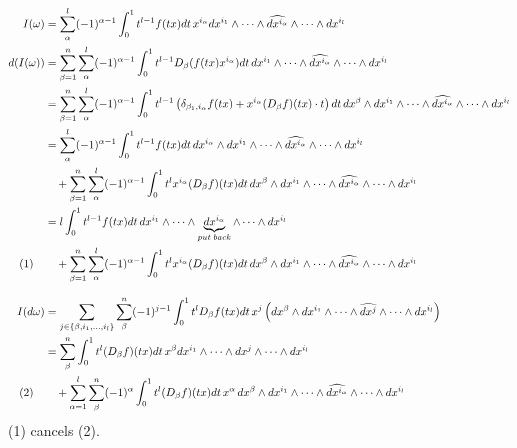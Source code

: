 \documentclass[11pt]{article}
\begin{document}
\begin{align*}
I(\omega) &=  \sum\limits_{\alpha}^{l} (-1)^{\alpha-1} \int_0^1 t^{l-1} f(tx) dt\, x^{i_\alpha} dx^{i_1} \wedge \cdots \wedge \widehat{dx^{i_\alpha}}  \wedge \cdots \wedge dx^{i_l}\\
d(I(\omega)) &= \sum\limits_{\beta=1}^{n} \sum\limits_{\alpha}^{l} (-1)^{\alpha-1} \int_0^1 t^{l-1}D_\beta(f(tx)x^{i_\alpha}) dt \, dx^{i_1} \wedge \cdots \wedge \widehat{dx^{i_\alpha}}  \wedge \cdots \wedge dx^{i_l}\\
&=\sum\limits_{\beta=1}^{n} \sum\limits_{\alpha}^{l} (-1)^{\alpha-1} \int_0^1 t^{l-1} \left(\delta_{\beta_1,i_\alpha}f(tx) +x^{i_\alpha}(D_\beta f)(tx)\cdot t \right)dt\,dx^\beta \wedge dx^{i_1} \wedge \cdots \wedge \widehat{dx^{i_\alpha}}  \wedge \cdots \wedge dx^{i_l}\\
&= \sum\limits_{\alpha}^{l} (-1)^{\alpha-1} \int_0^1 t^{l-1}f(tx) dt\,dx^{i_\alpha} \wedge dx^{i_1} \wedge \cdots \wedge \widehat{dx^{i_\alpha}}  \wedge \cdots \wedge dx^{i_l}\\
&\quad +\sum\limits_{\beta=1}^{n} \sum\limits_{\alpha}^{l} (-1)^{\alpha-1} \int_0^1 t^{l}x^{i_\alpha}(D_\beta f)(tx) dt\,dx^\beta \wedge dx^{i_1} \wedge \cdots \wedge \widehat{dx^{i_\alpha}}  \wedge \cdots \wedge dx^{i_l}\\
&= l \int_0^1 t^{l-1}f(tx) dt\, dx^{i_1} \wedge \cdots \wedge \underbrace{dx^{i_\alpha}}_{put \;back}  \wedge \cdots \wedge dx^{i_l}\\
(1) \quad &\quad+\sum\limits_{\beta=1}^{n} \sum\limits_{\alpha}^{l} (-1)^{\alpha-1} \int_0^1 t^{l}x^{i_\alpha}(D_\beta f)(tx) dt\,dx^\beta \wedge dx^{i_1} \wedge \cdots \wedge \widehat{dx^{i_\alpha}}  \wedge \cdots \wedge dx^{i_l}\\
\intertext{}
I(d\omega) &= \sum\limits_{j \in \{\beta, i_1, \dots, i_l\}} \sum\limits_{\beta}^{n} (-1)^{j-1} \int_0^1 t^{l} D_\beta f(tx) dt \, x^j\left(dx^{\beta}\wedge dx^{i_1} \wedge \cdots \wedge \widehat{dx^{j}}  \wedge \cdots \wedge dx^{i_l}\right)\\
&=  \sum\limits_{\beta}^{n} \int_0^1 t^{l} (D_\beta f)(tx) dt \,  x^{\beta} dx^{i_1} \wedge \cdots \wedge dx^{j}  \wedge \cdots \wedge dx^{i_l}\\
(2) \quad &\quad + \sum\limits_{\alpha =1}^{l} \sum\limits_{\beta}^{n} (-1)^{\alpha} \int_0^1 t^{l} (D_\beta f)(tx) dt \, x^\alpha \,dx^{\beta}\wedge dx^{i_1} \wedge \cdots \wedge \widehat{dx^{i_\alpha}}  \wedge \cdots \wedge dx^{i_l}
\end{align*}
(1) cancels (2). 
\end{document}
